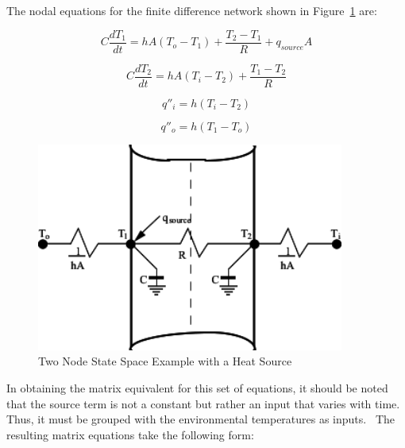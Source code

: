 The nodal equations for the finite difference network shown in Figure~\ref{fig:two-node-state-space-example-with-a-heat} are:

\begin{equation}
C\frac{{d{T_1}}}{{dt}} = hA\left( {{T_o} - {T_1}} \right) + \frac{{{T_2} - {T_1}}}{R} + {q_{source}}A
\end{equation}

\begin{equation}
C\frac{{d{T_2}}}{{dt}} = hA\left( {{T_i} - {T_2}} \right) + \frac{{{T_1} - {T_2}}}{R}
\end{equation}

\begin{equation}
{q''_i} = h\left( {{T_i} - {T_2}} \right)
\end{equation}

\begin{equation}
{q''_o} = h\left( {{T_1} - {T_o}} \right)
\end{equation}

\begin{figure}[hbtp] %
\centering
\includegraphics[width=0.9\textwidth, height=0.9\textheight, keepaspectratio=true]{media/image6034.svg.png}
\caption{Two Node State Space Example with a Heat Source \protect \label{fig:two-node-state-space-example-with-a-heat}}
\end{figure}

In obtaining the matrix equivalent for this set of equations, it should be noted that the source term is not a constant but rather an input that varies with time.~ Thus, it must be grouped with the environmental temperatures as inputs.~ The resulting matrix equations take the following form:

